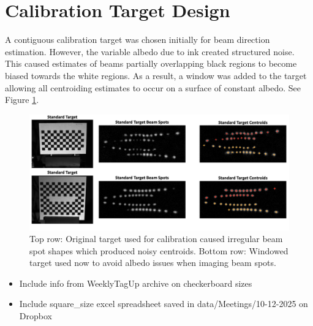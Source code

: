 \section{Calibration Target Design} \label{appx:calibration_checkerboard_design}
A contiguous calibration target was chosen initially for beam direction estimation. However, the variable albedo due to ink created structured noise. This caused estimates of beams partially overlapping black regions to become biased towards the white regions. As a result, a window was added to the target allowing all centroiding estimates to occur on a surface of constant albedo. See Figure \ref{fig:target_window}.

\begin{figure}
    \centering
    \includegraphics[width=\linewidth]{figures/CalTarget_Std_vs_Windowed.png}
    \caption{Top row: Original target used for calibration caused irregular beam spot shapes which produced noisy centroids. Bottom row: Windowed target used now to avoid albedo issues when imaging beam spots.}
    \label{fig:target_window}
\end{figure}


\begin{itemize}
    \item Include info from WeeklyTagUp archive on checkerboard sizes
    \item Include square\_size excel spreadsheet saved in data/Meetings/10-12-2025 on Dropbox
\end{itemize}
